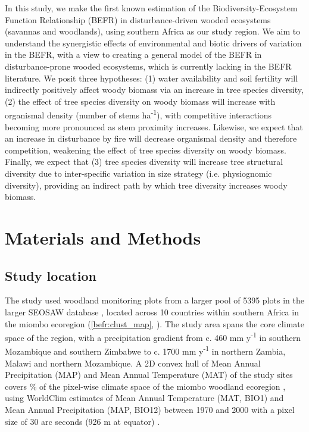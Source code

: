 \begin{refsection}
In this study, we make the first known estimation of the Biodiversity-Ecosystem Function Relationship (BEFR) in disturbance-driven wooded ecosystems (savannas and woodlands), using southern Africa as our study region. We aim to understand the synergistic effects of environmental and biotic drivers of variation in the BEFR, with a view to creating a general model of the BEFR in disturbance-prone wooded ecosystems, which is currently lacking in the BEFR literature. We posit three hypotheses: (1) water availability and soil fertility will indirectly positively affect woody biomass via an increase in tree species diversity, (2) the effect of tree species diversity on woody biomass will increase with organismal density (number of stems ha\textsuperscript{-1}), with competitive interactions becoming more pronounced as stem proximity increases. Likewise, we expect that an increase in disturbance by fire will decrease organismal density and therefore competition, weakening the effect of tree species diversity on woody biomass. Finally, we expect that (3) tree species diversity will increase tree structural diversity due to inter-specific variation in size strategy (i.e. physiognomic diversity), providing an indirect path by which tree diversity increases woody biomass.

\section{Materials and Methods}
\label{befr:sec:methods}

\subsection{Study location}
\label{befr:ssec:location}

The study used \nplots{} woodland monitoring plots from a larger pool of 5395 plots in the larger SEOSAW database \citep{SEOSAW2020}, located across 10 countries within southern Africa in the miombo ecoregion (\autoref{befr:clust_map}, \citealp{White1987}). The study area spans the core climate space of the region, with a precipitation gradient from c. 460 mm y\textsuperscript{-1} in southern Mozambique and southern Zimbabwe to c. 1700 mm y\textsuperscript{-1} in northern Zambia, Malawi and northern Mozambique. A 2D convex hull of Mean Annual Precipitation (MAP) and Mean Annual Temperature (MAT) of the study sites covers \hullcover{}\% of the pixel-wise climate space of the miombo woodland ecoregion \citep{White1987}, using WorldClim estimates of Mean Annual Temperature (MAT, BIO1) and Mean Annual Precipitation (MAP, BIO12) between 1970 and 2000 with a pixel size of 30 arc seconds (926 m at equator) \citep{Fick2017}. 


\end{refsection}
